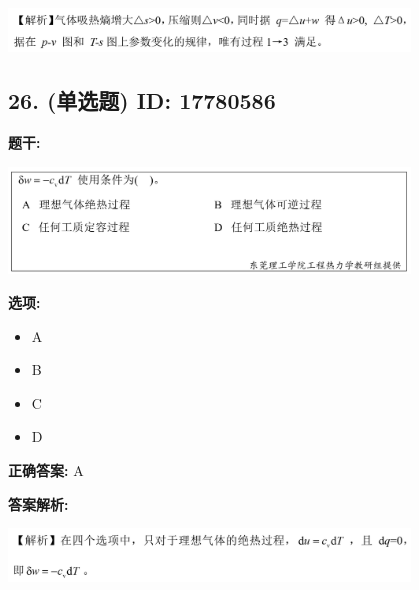 \documentclass[12pt]{article}
\begin{document}
\begin{center}\includegraphics[width=0.8\textwidth, height=0.25\textheight, keepaspectratio]{question_25_17780603/correct_replay_img_1.png}\end{center}

\vspace{0.5em}\hrulefill\vspace{1em}

\subsection*{26. (单选题) \small ID: 17780586}

\textbf{题干:}


\begin{center}\includegraphics[width=0.8\textwidth, height=0.25\textheight, keepaspectratio]{question_26_17780586/title_img_1.png}\end{center}

\textbf{选项:}
\begin{itemize}[leftmargin=*]
  \item A

  \item B

  \item C

  \item D

\end{itemize}

\textbf{正确答案:}
A

\textbf{答案解析:}


\begin{center}\includegraphics[width=0.8\textwidth, height=0.25\textheight, keepaspectratio]{question_26_17780586/correct_replay_img_1.png}\end{center}
\end{document}
